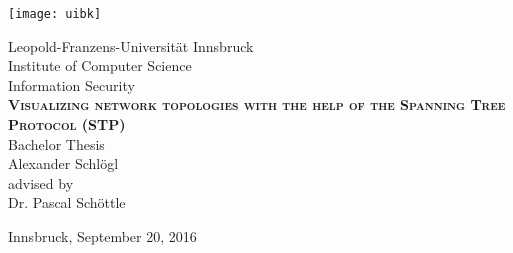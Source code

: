 \begin{titlepage}

    \begin{center}

        \texttt{[image: uibk]}

        \large Leopold-Franzens-Universit\"at Innsbruck\\
        [0.5cm]  

        \large Institute of Computer Science\\Information Security\\
        [3cm]

        \textsc{\large\textbf{Visualizing network topologies with the help of the Spanning Tree Protocol (STP)}}\\
        Bachelor Thesis\\
        [2cm]

        Alexander Schlögl\\
        [3.5cm]

        advised by\\
        Dr. Pascal Schöttle\\

        \vfill

        Innsbruck, September 20, 2016

    \end{center}

\end{titlepage}


